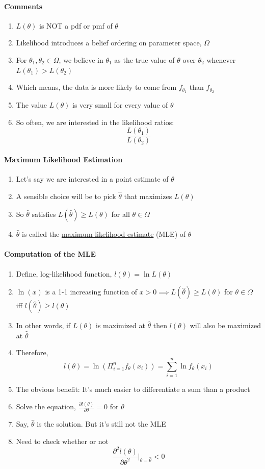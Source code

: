 \documentclass[11pt]{article}
\newcommand{\under}[1]{\underline{#1}}
\begin{document}
\paragraph{Comments}
\begin{enumerate}
	\item $L(\theta)$ is NOT a pdf or pmf of $\theta$
	\item Likelihood introduces a belief ordering on parameter space, $\Omega$
	\item For $\theta_1, \theta_2 \in \Omega$, we believe in $\theta_1$ as the true value of $\theta$ over $\theta_2$ whenever $L(\theta_1) > L(\theta_2)$
	\item Which means, the data is more likely to come from $f_{\theta_1}$ than $f_{\theta_2}$
	\item The value $L(\theta)$ is very small for every value of $\theta$
	\item So often, we are interested in the likelihood ratios:
	$$\frac{L(\theta_1)}{L(\theta_2)}$$
\end{enumerate}
\paragraph{Maximum Likelihood Estimation}
\begin{enumerate}
	\item Let's say we are interested in a point estimate of $\theta$
	\item A sensible choice will be to pick $\hat{\theta}$ that maximizes $L(\theta)$
	\item So $\hat{\theta}$ satisfies $L(\hat{\theta}) \geq L(\theta)$ for all $\theta \in \Omega$
	\item $\hat{\theta}$ is called the \under{maximum likelihood estimate} (MLE) of $\theta$
\end{enumerate}
\paragraph{Computation of the MLE}
\begin{enumerate}
	\item Define, log-likelihood function, $l(\theta) = \ln{L(\theta)}$
	\item $\ln(x)$ is a 1-1 increasing function of $x > 0 \implies L(\hat{\theta}) \geq L(\theta)$ for $\theta \in \Omega$ iff $l(\hat{\theta}) \geq l(\theta)$
	\item In other words, if $L(\theta)$ is maximized at $\hat{\theta}$ then $l(\theta)$ will also be maximized at $\hat{\theta}$
	\item Therefore, $$l(\theta) = \ln{(\Pi_{i=1}^nf_\theta(x_i))} = \sum_{i=1}^n\ln{f_\theta(x_i)}$$
	\item The obvious benefit: It's much easier to differentiate a sum than a product
	\item Solve the equation, $\frac{\partial l(\theta)}{\partial \theta} = 0$ for $\theta$
	\item Say, $\hat{\theta}$ is the solution. But it's still not the MLE
	\item Need to check whether or not $$\frac{\partial^2 l(\theta)}{\partial \theta^2}\vert_{\theta = \hat{\theta}} < 0$$
\end{enumerate}
\end{document}
